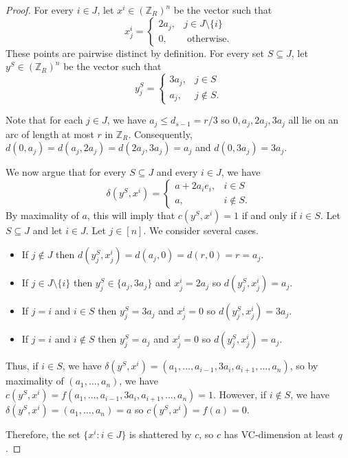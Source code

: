 \documentclass[10pt,a4paper]{amsart}
\begin{document}
\begin{proof}
    For every $i \in J$, let $x^i \in (\mathbb{Z}_{R})^n$ be the vector such that \[x^i_j = \begin{cases}
      2a_j, &j \in J \setminus \{i\} \\
      0, & \text{ otherwise}.
    \end{cases}\]
    These points are pairwise distinct by definition.
    For every set $S \subseteq J$, let $y^S\in (\mathbb{Z}_{R})^n$ be the vector such that \[y^S_j = \begin{cases}
      3a_j, &j \in S \\
      a_j, &j \notin S.
    \end{cases}\]
    
    Note that for each $j \in J$, we have $a_j \leq d_{s-1} = r/3$ so $0, a_j, 2a_j, 3a_j$ all lie on an arc of length at most $r$ in $\mathbb{Z}_R$. Consequently, $d(0, a_j) = d(a_j, 2a_j) = d(2a_j, 3a_j) = a_j$ and $d(0, 3a_j) = 3a_j$.
    
    We now argue that for every $S \subseteq J$ and every $i \in J$, we have \[\delta(y^S, x^i) = \begin{cases}
        a+2a_ie_i, &i \in S \\
        a, &i \notin S.
    \end{cases}\] 
    By maximality of $a$, this will imply that $c(y^S, x^i) = 1$ if and only if $i \in S$.
    Let $S \subseteq J$ and let $i \in J$.
    Let $j \in [n]$. We consider several cases. \begin{itemize}
        \item If $j \notin J$ then $d(y^S_j, x^i_j) = d(a_j, 0) = d(r, 0) = r = a_j$.
        \item If $j \in J \setminus \{i\}$ then $y^S_j \in \{a_j, 3a_j\}$ and $x^i_j = 2a_j$ so $d(y^S_j, x^i_j) = a_j$.
        \item If $j = i$ and $i \in S$ then $y^S_j = 3a_j$ and $x^i_j = 0$ so $d(y^S_j, x^i_j) = 3a_j$.
        \item If $j=i$ and $i \notin S$ then $y^S_j = a_j$ and $x^i_j = 0$ so $d(y^S_j, x^i_j) = a_j$.
    \end{itemize}
    
    Thus, if $i \in S$, we have $\delta(y^S, x^i) = (a_1, \ldots, a_{i-1}, 3a_i, a_{i+1}, \ldots, a_n)$, so by maximality of $(a_1, \ldots, a_n)$, we have $c(y^S, x^i) = f(a_1, \ldots, a_{i-1}, 3a_i, a_{i+1}, \ldots, a_n) = 1$.
    However, if $i \notin S$, we have $\delta(y^S, x^i) = (a_1, \ldots, a_n) = a$ so $c(y^S, x^i) = f(a) = 0$.
    
    Therefore, the set $\{x^i : i \in J\}$ is shattered by $c$, so $c$ has VC-dimension at least $q$.
\end{proof}
\end{document}
